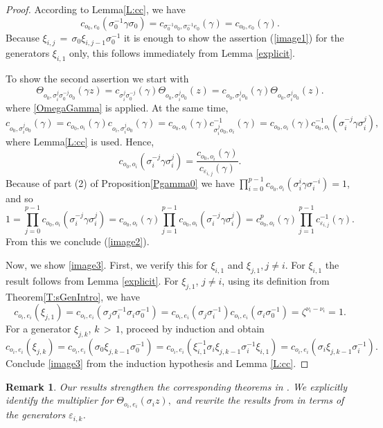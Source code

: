 \documentclass[]{amsart}
\numberwithin{equation}{section}
\newtheorem{remark}[theorem]{Remark}
\begin{document}
\begin{proof}
According to Lemma\;\ref{L:cc}, we have
$$ c_{o_0,e_0} (\sigma_0^{-1} \gamma \sigma_0) = 
c_{\sigma_0^{-1} o_0, \sigma_0^{-1} e_0} (\gamma) 
=  c_{o_0, e_0} (\gamma). $$
Because $\xi_{i,j}\,{=}\,\sigma_0 \xi_{i,j-1} \sigma_0^{-1}$ 
it is enough to show the assertion (\ref{image1}) for the generators $\xi_{i,1}$ only,  
this follows immediately from Lemma \ref{explicit}.

To show the second assertion we start with 
\begin{equation}
\Theta_{o_0,\sigma_i^j \sigma_0^{-j} o_0}(\gamma z)
= c_{\sigma_i^j \sigma_0^{-j}}(\gamma) \Theta_{o_0,\sigma_i^j  o_0}(z) 
= c_{o_0,\sigma_i^j o_0}(\gamma) \Theta_{o_0,\sigma_i^j  o_0} (z).
\end{equation}
where \eqref{OmegaGamma} is applied. At the same time,
\begin{equation}
c_{o_0,\sigma_i^j o_0}(\gamma) = c_{o_0,o_i}(\gamma) c_{o_i,\sigma_i^j o_0}(\gamma)
= c_{o_0,o_i}(\gamma) c^{-1}_{\sigma_i^j o_0,o_i}(\gamma) = c_{o_0,o_i}(\gamma) 
c^{-1}_{o_0,o_i}(\sigma_i^{-j} \gamma \sigma_i^{j}),
\end{equation}
where Lemma\;\ref{L:cc} is used.
Hence,
\begin{equation}
c_{o_0,o_i}(\sigma_i^{-j} \gamma \sigma_i^{j}) = \frac{c_{o_0,o_i}(\gamma)}{c_{\varepsilon_{i,j}}(\gamma)}.
\end{equation}
Because of part (2) of Proposition\;\ref{Pgamma0} we have
 $\prod_{i=0}^{p-1}c_{o_0,o_i}(\sigma_i^i \gamma \sigma_i^{-i})=1$, and so
\begin{equation}
1=\prod_{j=0}^{p-1} c_{o_0,o_i}(\sigma_i^{-j}\gamma \sigma_i^{j})
= c_{o_0,o_i}(\gamma) \prod_{j=1}^{p-1} c_{o_0,o_i}(\sigma_i^{-j} \gamma \sigma_i^{j})
= c^p_{o_0,o_i}(\gamma) \prod_{j=1}^{p-1} c_{\varepsilon_{i,j}}^{-1}(\gamma).
\end{equation} 
From this we conclude (\ref{image2}).

Now, we show \eqref{image3}. First, we verify this for $\xi_{i,1}$ and $\xi_{j,1},j\neq i.$ For $\xi_{i,1}$ 
the result follows from Lemma \ref{explicit}. For $\xi_{j,1}$, $j\neq i$, using its definition from Theorem\;\ref{T:sGenIntro},
we have 
\begin{equation}
c_{o_i,e_i}(\xi_{j,1})=c_{o_i,e_i}(\sigma_j\sigma_i^{-1}\sigma_i\sigma_0^{-1})=c_{o_i,e_i}(\sigma_j\sigma_i^{-1})c_{o_i,e_i}(\sigma_i\sigma_0^{-1})=\zeta^{\nu_i-\nu_i}=1.
\end{equation}
For a generator $\xi_{j,k}$, $k\,{>}\,1$, proceed by induction and obtain
\begin{equation}
c_{o_i,e_i}(\xi_{j,k})=c_{o_i,e_i}(\sigma_0\xi_{j,k-1}\sigma_0^{-1})=c_{o_i, e_i}(\xi_{i,1}^{-1}\sigma_i\xi_{j, k-1}\sigma_i^{-1}\xi_{i,1})=c_{o_i, e_i}(\sigma_i\xi_{j, k-1}\sigma_i^{-1}).
\end{equation}
Conclude \eqref{image3} from the induction hypothesis and Lemma \ref{L:cc}.
\end{proof}
\begin{remark}
Our results strengthen  the corresponding theorems in \cite{V1,V2}. We explicitly identify the multiplier for $\Theta_{o_i,e_i}(\sigma_i z),$ and rewrite the results from \cite{V1,V2} in terms of the generators $\varepsilon_{i,k}$. 
\end{remark}
\end{document}
